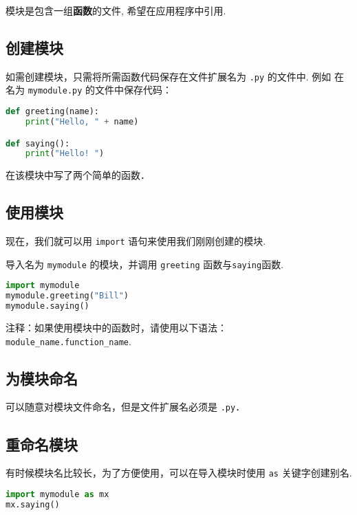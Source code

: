 
模块是包含一组\textbf{函数}的文件, 希望在应用程序中引用.
\subsection{创建模块}
如需创建模块，只需将所需函数代码保存在文件扩展名为 \verb|.py| 的文件中. 例如
在名为 \verb|mymodule.py| 的文件中保存代码：
\begin{lstlisting}[language=python]
def greeting(name):
    print("Hello, " + name)

def saying():
    print("Hello! ")
\end{lstlisting}
在该模块中写了两个简单的函数．

\subsection{使用模块}
现在，我们就可以用 \verb|import| 语句来使用我们刚刚创建的模块.

导入名为 \verb|mymodule| 的模块，并调用 \verb|greeting| 函数与\verb|saying|函数.
\begin{lstlisting}[language=python]
import mymodule
mymodule.greeting("Bill")
mymodule.saying()
\end{lstlisting}
注释：如果使用模块中的函数时，请使用以下语法：\verb|module_name.function_name|.

\subsection{为模块命名}
可以随意对模块文件命名，但是文件扩展名必须是 \verb|.py|．

\subsection{重命名模块}
有时候模块名比较长，为了方便使用，可以在导入模块时使用 \verb|as| 关键字创建别名.
\begin{lstlisting}[language=python]
import mymodule as mx
mx.saying()
\end{lstlisting}